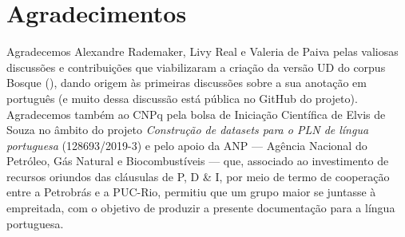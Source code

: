 \documentclass[output=paper,colorlinks,citecolor=brown]{langscibook}
\begin{document}
\chapter{Agradecimentos}

Agradecemos Alexandre Rademaker, Livy Real e Valeria de Paiva pelas valiosas discussões e contribuições que viabilizaram a criação da versão UD do corpus Bosque (\citet{rademaker2017universal}), dando origem às primeiras discussões sobre a sua anotação em português (e muito dessa discussão está pública no GitHub do projeto). Agradecemos também ao CNPq pela bolsa de Iniciação Científica de Elvis de Souza no âmbito do projeto \emph{Construção de datasets para o PLN de língua portuguesa} (128693/2019-3) e pelo apoio da ANP — Agência Nacional do Petróleo, Gás Natural e Biocombustíveis — que, associado ao investimento de recursos oriundos das cláusulas de P, D \& I, por meio de termo de cooperação entre a Petrobrás e a PUC-Rio, permitiu que um grupo maior se juntasse à empreitada, com o objetivo de produzir a presente documentação para a língua portuguesa.

\printbibliography[]
\end{document}
